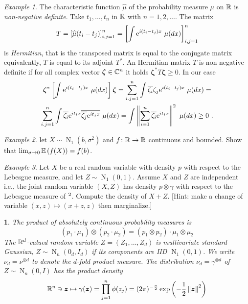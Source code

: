 \documentclass[12pt,a4paper]{amsart}
\newcommand{\bz}{\bm z}
\newcommand{\gaussian}[3]{\operatorname{N}_{#1}\left(#2,#3\right)}
\theoremstyle{plain}%
\newtheorem{npar}{}%
\theoremstyle{definition}
\theoremstyle{remark}
\newtheorem{example}{Example}
\begin{document}
\begin{example}
The characteristic function $\widehat \mu$ of the probability measure $\mu$ on $\mathbb{R}$ is \emph{non-negative definite}. Take $t_1,\dots,t_n$ in $\mathbb{R}$ with $n = 1,2,\dots$. The matrix
\begin{equation*}
  T = \left[ \widehat \mu(t_i - t_j) \right]_{i,j=1}^n = \left[ \int \euler^{i(t_i - t_j)x} \ \mu(dx)\right]_{i,j=1}^n 
\end{equation*}
is \emph{Hermitian}, that is the transposed matrix is equal to the conjugate matrix equivalently, $T$ is equal to its adjoint $T^*$. An Hermitian matrix $T$ is non-negative definite if for all complex vector $\bm \zeta \in \mathbb C^n$ it holds $\bm \zeta^* T \bm \zeta \geq 0$. In our case
\begin{multline*}
  \bm \zeta ^* \left[ \int \mathrm{e}^{i(t_i - t_j)x} \ \mu(dx)\right] \bm \zeta = \sum_{i.j=1}^n \int \overline{\zeta_i}\zeta_j \mathrm{e}^{i(t_i - t_j)x} \ \mu(dx) = \\ \sum_{i.j=1}^n \int \overline{\zeta_i}\mathrm{e}^{it_ix} \overline{\overline{\zeta_j}\mathrm{e}^{it_jx}}  \ \mu(dx) = \int \left\Vert\sum_{i=1}^n \overline{\zeta_i}\mathrm{e}^{it_ix}\right\Vert^2 \ \mu(dx) \geq 0 \ .
\end{multline*}
\end{example}

\begin{example}
let $X \sim \gaussian 1 b {\sigma^2}$ and $f \colon \mathbb{R} \to \mathbb{R}$ continuous and bounded. Show that $\lim_{\sigma \to 0} \operatorname{\mathbb E}\left(f(X)\right) = f(b)$.   
\end{example}

\begin{example}
  Let $X$ be a real random variable with density $p$ with respect to the Lebesgue measure, and let $Z \sim \gaussian 1 0 1$. Assume $X$ and $Z$ are independent i.e., the joint random variable $(X,Z)$ has density $p \otimes \gamma$ with respect to the Lebesgue measure of $\real^2$. Compute the density of $X+Z$. [Hint: make a change of variable $(x,z) \mapsto (x+z,z)$ then marginalize.]
\end{example}

\begin{npar} \normalfont
The product of absolutely continuous probability measures is
  \begin{equation*}
    (p_1 \cdot \mu_1)\otimes(p_2\cdot\mu_2) = (p_1\otimes p_2)\cdot \mu_1\otimes \mu_2
  \end{equation*}
  The $\mathbb{R}^d$-valued random variable $Z = (Z_1,\dots,Z_d)$ is multivariate \emph{standard Gaussian}, $Z \sim \gaussian n {0_d} {I_d}$ if its components are IID $\gaussian 1 0 1$. We write $\nu_d = \nu^{\otimes d}$ to denote the $d$-fold product measure.
The distribution $\nu_d = \gamma^{\otimes d}$ of $Z \sim \gaussian n 0 I$ has the product density
%
  \begin{equation*}
    \reals^n \ni \bz \mapsto \gamma(\bz) = \prod_{j=1}^n \phi(z_j) = (2\pi)^{-\frac{n}2} \expof{-\frac12 \normof{\bz}^2}
  \end{equation*}
\end{npar}
\end{document}
